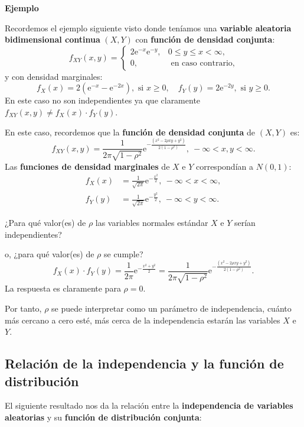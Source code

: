 \documentclass[]{book}
\begin{document}
\textbf{Ejemplo}

Recordemos el ejemplo siguiente visto donde teníamos una \textbf{variable aleatoria bidimensional continua} \((X,Y)\) con \textbf{función de densidad conjunta}:
\[
f_{XY}(x,y)=\begin{cases}
2 \mathrm{e}^{-x}\mathrm{e}^{-y}, & 0\leq y\leq x < \infty,\\
0, & \mbox{ en caso contrario,}
\end{cases}
\]
y con densidad marginales:
\[
f_X(x)  = 2\left(\mathrm{e}^{-x}-\mathrm{e}^{-2x}\right),\mbox{ si }x\geq 0, \quad
f_Y(y)  =  2\mathrm{e}^{-2y}, \mbox{ si }y\geq 0.
\]
En este caso no son independientes ya que claramente \(f_{XY}(x,y)\neq f_X(x)\cdot f_Y(y)\).

En este caso, recordemos que la \textbf{función de densidad conjunta} de \((X,Y)\) es:
\[
f_{XY}(x,y)=\frac{1}{2\pi\sqrt{1-\rho^2}}\mathrm{e}^{-\frac{(x^2-2\rho xy+y^2)}{2(1-\rho^2)}},\ -\infty <x,y<\infty.
\]
Las \textbf{funciones de densidad marginales} de \(X\) e \(Y\) correspondían a \(N(0,1)\):
\[
\begin{array}{rl}
f_X(x) & =\frac{1}{\sqrt{2\pi}}\mathrm{e}^{-\frac{x^2}{2}},\ -\infty <x<\infty,\\ f_Y(y) & =\frac{1}{\sqrt{2\pi}}\mathrm{e}^{-\frac{y^2}{2}},\ -\infty <y<\infty.
\end{array}
\]

¿Para qué valor(es) de \(\rho\) las variables normales estándar \(X\) e \(Y\) serían independientes?

o, ¿para qué valor(es) de \(\rho\) se cumple?
\[
f_X(x)\cdot f_Y(y)=\frac{1}{2\pi}\mathrm{e}^{-\frac{x^2+y^2}{2}} = \frac{1}{2\pi\sqrt{1-\rho^2}}\mathrm{e}^{-\frac{(x^2-2\rho xy+y^2)}{2(1-\rho^2)}}.
\]
La respuesta es claramente para \(\rho=0\).

Por tanto, \(\rho\) se puede interpretar como un parámetro de independencia, cuánto más cercano a cero esté, más cerca de la independencia estarán las variables \(X\) e \(Y\).

\hypertarget{relaciuxf3n-de-la-independencia-y-la-funciuxf3n-de-distribuciuxf3n}{%
\subsection{Relación de la independencia y la función de distribución}\label{relaciuxf3n-de-la-independencia-y-la-funciuxf3n-de-distribuciuxf3n}}

El siguiente resultado nos da la relación entre la \textbf{independencia de variables aleatorias} y su \textbf{función de distribución conjunta}:
\end{document}
